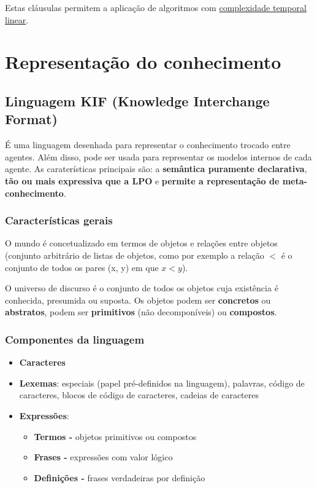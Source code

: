 \documentclass{article}
\begin{document}
Estas cláusulas permitem a aplicação de algoritmos com \uline{complexidade temporal linear}.

\pagebreak

\section{Representação do conhecimento}

\subsection{Linguagem KIF (Knowledge Interchange Format)}

É uma linguagem desenhada para representar o conhecimento trocado entre agentes.
Além disso, pode ser usada para representar os modelos internos de cada agente.
As caraterísticas principais são: a \textbf{semântica puramente declarativa},
\textbf{tão ou mais expressiva que a LPO} e \textbf{permite a representação
de meta-conhecimento}.

\subsubsection{Características gerais}

O mundo é concetualizado em termos de objetos e relações entre objetos
(conjunto arbitrário de listas de objetos, como por exemplo
a relação $<$ é o conjunto de todos os pares (x, y) em que $x < y$).

\vspace{2mm}

O universo de discurso é o conjunto de todos os objetos cuja existência
é conhecida, presumida ou suposta. Os objetos podem ser \textbf{concretos} ou \textbf{abstratos},
podem ser \textbf{primitivos} (não decomponíveis) ou \textbf{compostos}.

\subsubsection{Componentes da linguagem}

\begin{itemize}
  \item \textbf{Caracteres}
  \item \textbf{Lexemas}: especiais (papel pré-definidos na linguagem), palavras,
  código de caracteres, blocos de código de caracteres, cadeias de caracteres
  \item \textbf{Expressões}:
  \begin{itemize}
    \item \textbf{Termos -} objetos primitivos ou compostos
    \item \textbf{Frases -} expressões com valor lógico
    \item \textbf{Definições -} frases verdadeiras por definição
  \end{itemize}
\end{itemize}
\end{document}
